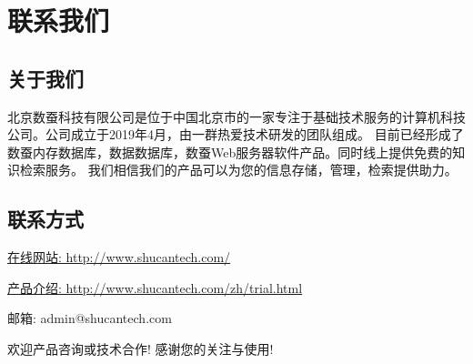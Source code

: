 \section{联系我们}\label{contact}

\linespread{1.2}
\large
\subsection{关于我们}
北京数蚕科技有限公司是位于中国北京市的一家专注于基础技术服务的计算机科技公司。公司成立于2019年4月，由一群热爱技术研发的团队组成。
目前已经形成了数蚕内存数据库，数据数据库，数蚕Web服务器软件产品。同时线上提供免费的知识检索服务。
我们相信我们的产品可以为您的信息存储，管理，检索提供助力。

\subsection{联系方式}
\bigskip

\href{http://www.shucantech.com/}{在线网站: http://www.shucantech.com/}

\href{http://www.shucantech.com/zh/trial.html}{产品介绍: http://www.shucantech.com/zh/trial.html}

邮箱: admin@shucantech.com

\bigskip
\bigskip
\bigskip
\centering\large{欢迎产品咨询或技术合作! 感谢您的关注与使用!}

